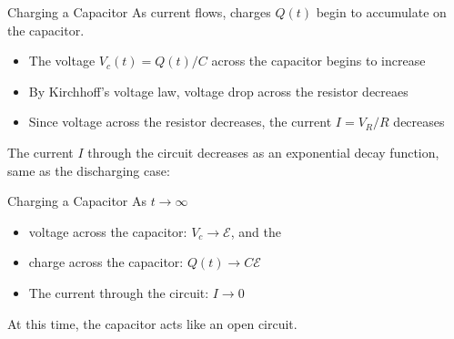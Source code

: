 \documentclass[12pt,aspectratio=169]{beamer}
\begin{document}
\begin{frame}{Charging a Capacitor}
  As current flows, charges $Q(t)$ begin to accumulate on the capacitor.
  \begin{itemize}
  \item The voltage $V_c(t)=Q(t)/C$ across the capacitor begins to increase
  \item By Kirchhoff's voltage law, voltage drop across the resistor decreaes
  \item Since voltage across the resistor decreases, the current $I=V_R/R$
    decreases
  \end{itemize}
  \begin{center}
    \vspace{-.1in}
  \end{center}
  The current $I$ through the circuit decreases as an exponential decay
  function, same as the discharging case:

\end{frame}




\begin{frame}{Charging a Capacitor}
  As $t\longrightarrow\infty$
  \begin{itemize}
  \item voltage across the capacitor: $V_c\longrightarrow\mathcal E$, and the
  \item charge across the capacitor: $Q(t)\longrightarrow C\mathcal E$
  \item The current through the circuit: $I\longrightarrow 0$
  \end{itemize}
  \begin{center}
    \vspace{-.1in}
  \end{center}
  At this time, the capacitor acts like an open circuit.
\end{frame}
\end{document}
